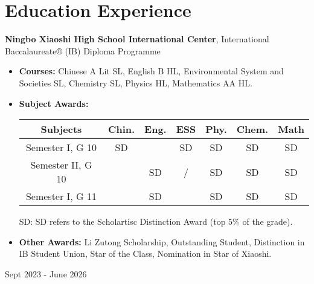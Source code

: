 \documentclass[10pt, letterpaper]{article}
\newenvironment{highlights}{
    \begin{itemize}[
        topsep=0.10 cm,
        parsep=0.10 cm,
        partopsep=0pt,
        itemsep=0pt,
        leftmargin=0.4 cm + 10pt
    ]
}{
    \end{itemize}
} %
\newenvironment{twocolentry}[2][]{
    \onecolentry
    \def\secondColumn{#2}
    \setcolumnwidth{\fill, 4.5 cm}
    \begin{paracol}{2}
}{
    \switchcolumn \raggedleft \secondColumn
    \end{paracol}
    \endonecolentry
} %
\let\hrefWithoutArrow\href
\renewcommand{\href}[2]{\hrefWithoutArrow{#1}{\ifthenelse{\equal{#2}{}}{ }{#2 }\raisebox{.15ex}{\footnotesize \faExternalLink*}}}
\begin{document}
    \section{Education Experience}
        \begin{twocolentry}{ Sept 2023 - June 2026 }
            \textbf{Ningbo Xiaoshi High School International Center}, International Baccalaureate® (IB) Diploma Programme
            \begin{highlights}
                \item \textbf{Courses:} Chinese A Lit SL, English B HL, Environmental System and Societies SL, Chemistry SL, Physics HL, Mathematics AA HL.
                \item \textbf{Subject Awards:}
                
                \vspace{0.2cm}
                \begin{tabular}{ c c c c c c c }
                    \hline
                    Subjects & Chin. & Eng. & ESS & Phy. & Chem. & Math \\ \hline
                    Semester I, G 10 & SD &  & SD & SD & SD & SD \\ %
                    Semester II, G 10 &  & SD & / & SD & SD & SD \\ 
                    Semester I, G 11 &  & SD & & SD & SD & SD \\\hline
                \end{tabular}
                \vspace{0.1cm} 
                
                {
                    \small

                SD: SD refers to the Scholartisc Distinction Award (top 5\% of the grade). %
                
                }
                
                \item \textbf{Other Awards:}
                Li Zutong Scholarship, Outstanding Student, Distinction in IB Student Union, Star of the Class, Nomination in Star of Xiaoshi.
                
                
            \end{highlights}
        \end{twocolentry}
\end{document}
